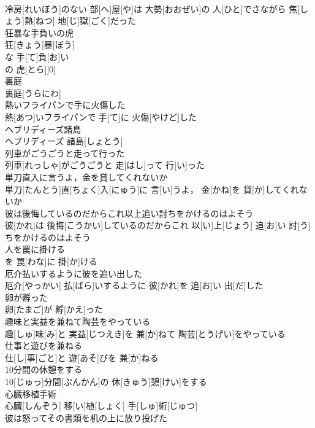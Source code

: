 \documentclass[8pt]{extreport}
\begin{document}
\begin{CJK}{UTF8}{min}
\\	冷房[れいぼう]のない 部[へ]屋[や]は 大勢[おおぜい]の 人[ひと]でさながら 焦[しょう]熱[ねつ] 地[じ]獄[ごく]だった
\\	狂暴な手負いの虎	
\\	狂[きょう]暴[ぼう]
\\	な 手[て]負[お]い 
\\	の 虎[とら]]0]
\\	裏庭	
\\	裏庭[うらにわ]
\\	熱いフライパンで手に火傷した	
\\	熱[あつ]いフライパンで 手[て]に 火傷[やけど]した
\\	ヘブリディーズ諸島	
\\	ヘブリディーズ 諸島[しょとう]
\\	列車がごうごうと走って行った	
\\	列車[れっしゃ]がごうごうと 走[はし]って 行[い]った
\\	単刀直入に言うよ，金を貸してくれないか	
\\	単刀[たんとう]直[ちょく]入[にゅう]に 言[い]うよ， 金[かね]を 貸[か]してくれないか
\\	彼は後悔しているのだからこれ以上追い討ちをかけるのはよそう	
\\	彼[かれ]は 後悔[こうかい]しているのだからこれ 以[い]上[じょう] 追[お]い 討[う]ちをかけるのはよそう
\\	人を罠に掛ける	
\\	[｟文語｠ 
\\	人[ひと]を 罠[わな]に 掛[か]ける
\\	厄介払いするように彼を追い出した	
\\	厄介[やっかい] 払[ばら]いするように 彼[かれ]を 追[お]い 出[だ]した
\\	卵が孵った	
\\	卵[たまご]が 孵[かえ]った
\\	趣味と実益を兼ねて陶芸をやっている	
\\	趣[しゅ]味[み]と 実益[じつえき]を 兼[か]ねて 陶芸[とうげい]をやっている
\\	仕事と遊びを兼ねる	
\\	仕[し]事[ごと]と 遊[あそ]びを 兼[か]ねる
\\	10分間の休憩をする	
\\	10[じゅっ]分間[ぷんかん]の 休[きゅう]憩[けい]をする
\\	心臓移植手術	
\\	心臓[しんぞう] 移[い]植[しょく] 手[しゅ]術[じゅつ]
\\	彼は怒ってその書類を机の上に放り投げた	

\end{CJK}
\end{document}
